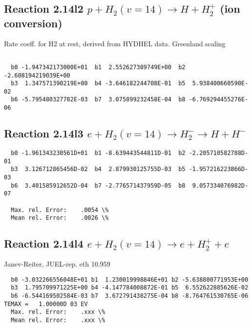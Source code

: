 \documentclass[12pt,dvipdfmx]{article}
\begin{document}
\subsection{
Reaction 2.14l2
$ p + H_2(v=14) \rightarrow H + H_2^+$ (ion conversion)
}
Rate coeff. for H2 at rest, derived from HYDHEL data. Greenland scaling


\begin{small}\begin{verbatim}

  b0 -1.947342173000E+01  b1  2.552627389749E+00  b2 -2.608194219039E+00
  b3  1.347571390219E+00  b4 -3.646182244708E-01  b5  5.938400660590E-02
  b6 -5.795480327782E-03  b7  3.075899232458E-04  b8 -6.769294455276E-06

\end{verbatim}\end{small}


\subsection{
Reaction 2.14l3
 $ e + H_2(v=14) \rightarrow H_2^- \rightarrow H + H^-$
}


\begin{small}\begin{verbatim}
  b0 -1.961343230561D+01  b1 -8.639443544811D-01  b2 -2.205710582788D-01
  b3  3.126712865456D-02  b4  2.879930125755D-03  b5 -1.957216223866D-03
  b6  3.401585912652D-04  b7 -2.776571437959D-05  b8  9.057334076982D-07

  Max. rel. Error:    .0054 \%
  Mean rel. Error:    .0026 \%
\end{verbatim}\end{small}

\subsection{
Reaction 2.14l4
 $ e + H_2(v=14) \rightarrow e + H_2^+  + e$
}
Janev-Reiter, JUEL-rep. eth  10.959

\begin{small}\begin{verbatim}
  b0 -3.032266556048E+01 b1  1.230019998846E+01 b2 -5.638800771953E+00
  b3  1.795709971225E+00 b4 -4.147784008872E-01 b5  6.552622885626E-02
  b6 -6.544169502584E-03 b7  3.672791438275E-04 b8 -8.764761530765E-06
TEMAX =   1.00000D 03 EV
  Max. rel. Error:    .xxx \%
  Mean rel. Error:    .xxx \%
\end{verbatim}\end{small}
\newpage
\end{document}
